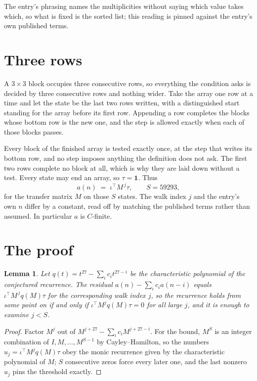 \documentclass[11pt,a4paper]{article}
\theoremstyle{plain}
\newtheorem{lemma}[theorem]{Lemma}
\theoremstyle{definition}
\begin{document}
The entry's phrasing names the multiplicities without saying which value takes which, so what is fixed is the sorted list; this reading is pinned against the entry's own published terms.

\section{Three rows}

A $3\times3$ block occupies three consecutive rows, so everything the condition asks is decided
by three consecutive rows and nothing wider. Take the array one row at a time and let the state
be the last two rows written, with a distinguished start standing for the array before its
first row. Appending a row completes the blocks whose bottom row is the new one, and the step
is allowed exactly when each of those blocks passes.

Every block of the finished array is tested exactly once, at the step that writes its bottom
row, and no step imposes anything the definition does not ask. The first two rows complete no
block at all, which is why they are laid down without a test. Every state may end an array, so
$\tau=\mathbf{1}$. Thus
\[
a(n)\;=\;\iota^{\!\top}M^{\,j}\tau ,\qquad S=59293,
\]
for the transfer matrix $M$ on those $S$ states. The walk index $j$ and the entry's own $n$
differ by a constant, read off by matching the published terms rather than assumed. In
particular $a$ is $C$-finite.

\section{The proof}

\begin{lemma}\label{lem:crit}
Let $q(t)=t^{27}-\sum_i c_it^{27-i}$ be the characteristic polynomial of the
conjectured recurrence. The residual $a(n)-\sum_ic_ia(n-i)$ equals
$\iota^{\!\top}M^{\,j}q(M)\tau$ for the corresponding walk index $j$, so the recurrence
holds from some point on if and only if $\iota^{\!\top}M^{j}q(M)\tau=0$ for all large $j$,
and it is enough to examine $j<S$.
\end{lemma}

\begin{proof}
Factor $M^{j}$ out of $M^{j+27}-\sum_ic_iM^{j+27-i}$. For the bound, $M^{S}$
is an integer combination of $I,M,\dots,M^{S-1}$ by Cayley--Hamilton, so the numbers
$u_j=\iota^{\!\top}M^{j}q(M)\tau$ obey the monic recurrence given by the characteristic
polynomial of $M$; $S$ consecutive zeros force every later one, and the last nonzero $u_j$
pins the threshold exactly.
\end{proof}
\end{document}
